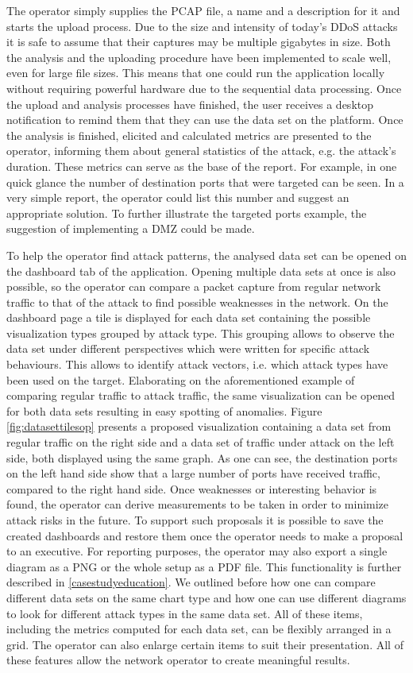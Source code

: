 The operator simply supplies the PCAP file, a name and a description for it and starts the upload process. Due to the size and intensity of today's DDoS attacks it is safe to assume that their captures may be multiple gigabytes in size. Both the analysis and the uploading procedure have been implemented to scale well, even for large file sizes. This means that one could run the application locally without requiring powerful hardware due to the sequential data processing. Once the upload and analysis processes have finished, the user receives a desktop notification to remind them that they can use the data set on the platform.
Once the analysis is finished, elicited and calculated metrics are presented to the operator, informing them about general statistics of the attack, e.g. the attack's duration. These metrics can serve as the base of the report. For example, in one quick glance the number of destination ports that were targeted can be seen. In a very simple report, the operator could list this number and suggest an appropriate solution. To further illustrate the targeted ports example, the suggestion of implementing a DMZ could be made. 

To help the operator find attack patterns, the analysed data set can be opened on the dashboard tab of the application. Opening multiple data sets at once is also possible, so the operator can compare a packet capture from regular network traffic to that of the attack to find possible weaknesses in the network. On the dashboard page a tile is displayed for each data set containing the possible visualization types grouped by attack type. This grouping allows to observe the data set under different perspectives which were written for specific attack behaviours. This allows to identify attack vectors, i.e. which attack types have been used on the target. Elaborating on the aforementioned example of comparing regular traffic to attack traffic, the same visualization can be opened for both data sets resulting in easy spotting of anomalies. Figure  \ref{fig:datasettilesop} presents a proposed visualization containing a data set from regular traffic on the right side and a data set of traffic under attack on the left side, both displayed using the same graph. As one can see, the destination ports on the left hand side show that a large number of ports have received traffic, compared to the right hand side.
Once weaknesses or interesting behavior is found, the operator can derive measurements to be taken in order to minimize attack risks in the future. To support such proposals it is possible to save the created dashboards and restore them once the operator needs to make a proposal to an executive. For reporting purposes, the operator may also export a single diagram as a PNG or the whole setup as a PDF file. This functionality is further described in \ref{casestudyeducation}. We outlined before how one can compare different data sets on the same chart type and how one can use different diagrams to look for different attack types in the same data set. All of these items, including the metrics computed for each data set, can be flexibly arranged in a grid. The operator can also enlarge certain items to suit their presentation. All of these features allow the network operator to create meaningful results. 


